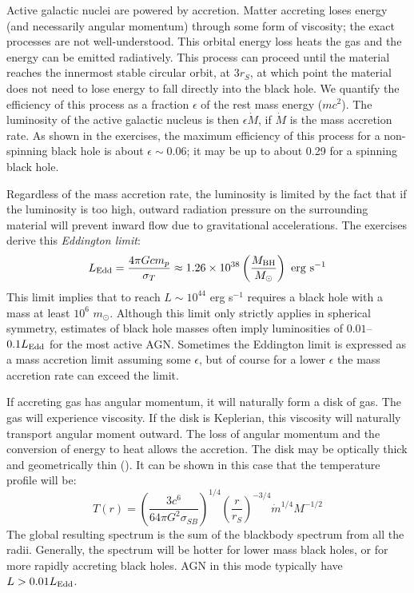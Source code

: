 Active galactic nuclei are powered by accretion. Matter accreting
loses energy (and necessarily angular momentum) through some form of
viscosity; the exact processes are not well-understood. This orbital
energy loss heats the gas and the energy can be emitted
radiatively. This process can proceed until the material reaches the
innermost stable circular orbit, at $3r_S$, at which point the
material does not need to lose energy to fall directly into the black
hole. We quantify the efficiency of this process as a fraction
$\epsilon$ of the rest mass energy ($mc^2$). The luminosity of the
active galactic nucleus is then $\epsilon \dot M$, if $\dot M$ is the
mass accretion rate. As shown in the exercises, the maximum efficiency
of this process for a non-spinning black hole is about $\epsilon \sim
0.06$; it may be up to about 0.29 for a spinning black hole.

Regardless of the mass accretion rate, the luminosity is limited by
the fact that if the luminosity is too high, outward radiation
pressure on the surrounding material will prevent inward flow due to
gravitational accelerations. The exercises derive this {\it Eddington
  limit}:
\begin{equation}
L_{\rm Edd} = \frac{4\pi G c m_p}{\sigma_T} \approx 1.26 \times
10^{38} \left(\frac{M_{\rm BH}}{M_\odot}\right) \mathrm{~erg~s}^{-1}
\end{equation}
This limit implies that to reach $L\sim 10^{44}$ erg s$^{-1}$ requires
a black hole with a mass at least $10^6$ $m_\odot$. Although this
limit only strictly applies in spherical symmetry, estimates of black
hole masses often imply luminosities of $0.01$--$0.1 L_{\rm Edd}$ for
the most active AGN. Sometimes the Eddington limit is expressed as a
mass accretion limit assuming some $\epsilon$, but of course for a
lower $\epsilon$ the mass accretion rate can exceed the limit.

If accreting gas has angular momentum, it will naturally form a disk
of gas. The gas will experience viscosity. If the disk is Keplerian,
this viscosity will naturally transport angular moment outward. The
loss of angular momentum and the conversion of energy to heat allows
the accretion. The disk may be optically thick and geometrically thin
(\citealt{shakura73a}). It can be shown in this case that the
temperature profile will be:
\begin{equation}
  T(r) = \left(\frac{3 c^6}{64\pi G^2 \sigma_{SB}}\right)^{1/4}
    \left(\frac{r}{r_S}\right)^{-3/4} {\dot m}^{1/4} M^{-1/2}
\end{equation}
The global resulting spectrum is the sum of the blackbody spectrum
from all the radii. Generally, the spectrum will be hotter for lower
mass black holes, or for more rapidly accreting black holes. AGN in
this mode typically have $L>0.01 L_{\rm Edd}$.

